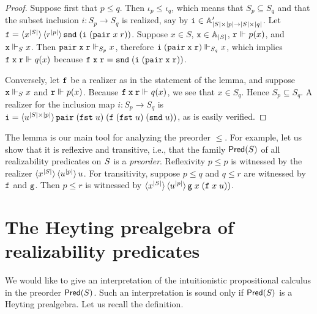 \begin{proof}
  Suppose first that $p \leq q$. Then $\iota_p \leq \iota_q$, which
  means that $S_p \subseteq S_q$ and that the subset inclusion $i :
  S_p \to S_q$ is realized, say by $\R{i} \in \subAtyp{|S| \times |p|
    \to |S| \times |q|}$. Let $\R{f} = \tpcalam{x}{|S|}
    \tpcalam{r}{|p|}{\combSnd\;(\R{i}\;(\combPair\;x\;r))}$. Suppose $x
  \in S$, $\R{x} \in \Atyp{|S|}$, $\R{r} \rz p(x)$, and $\R{x} \rz[S]
  x$. Then $\combPair\;\R{x}\;\R{r} \rz[S_p] x$, therefore
  $\R{i}\;(\combPair\;\R{x}\;\R{r}) \rz[S_q] x$, which implies
  $\R{f}\;\R{x}\;\R{r} \rz q(x)$ because $\R{f}\;\R{x}\;\R{r} =
  \combSnd\;(\R{i}\;(\combPair\;\R{x}\;\R{r}))$.

  Conversely, let $\R{f}$ be a realizer as in the statement of the
  lemma, and suppose $\R{x} \rz[S] x$ and $\R{r} \rz p(x)$. Because
  $\R{f}\;\R{x}\;\R{r} \rz q(x)$, we see that $x \in S_q$. Hence $S_p
  \subseteq S_q$. A realizer for the inclusion map $i : S_p \to S_q$
  is $\R{i} = \tpcalam{u}{|S| \times
      |p|}{\combPair\;(\combFst\;u)\;(\R{f}\;(\combFst\;u)\;(\combSnd\;u))}$,
  as is easily verified.
\end{proof}

The lemma is our main tool for analyzing the preorder $\leq$. For
example, let us show that it is reflexive and transitive, i.e., that
the family $\Pred{\asm{S}}$ of all realizability predicates on
$\asm{S}$ is a \emph{preorder}. Reflexivity $p \leq p$ is witnessed by
the realizer $\tpcalam{x}{|S|} \tpcalam{u}{|p|}{u}$. For
transitivity, suppose $p \leq q$ and $q \leq r$ are witnessed by
$\R{f}$ and $\R{g}$. Then $p \leq r$ is witnessed by
$\tpcalam{x}{|S|} \tpcalam{u}{|p|}{\R{g}\;x\;(\R{f}\;x\;u))}$.


\section{The Heyting prealgebra of realizability predicates}
\label{sec:heyting-prealgebra}

We would like to give an interpretation of the intuitionistic
propositional calculus in the preorder $\Pred{\asm{S}}$. Such an
interpretation is sound only if $\Pred{\asm{S}}$ is a Heyting
prealgebra. Let us recall the definition.

